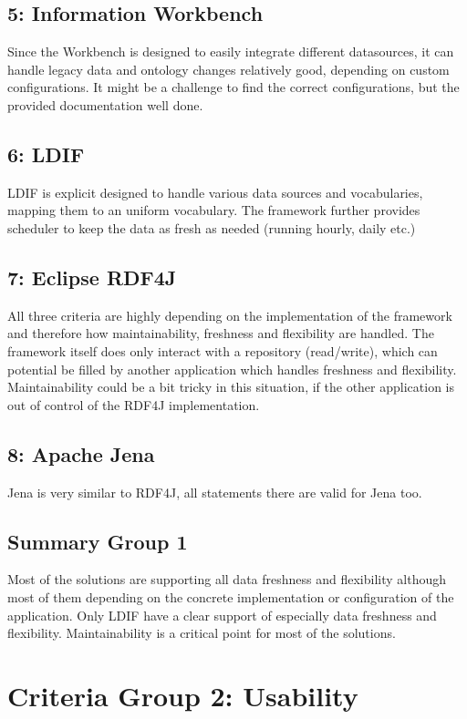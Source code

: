 \subsection*{5: Information Workbench}
Since the Workbench is designed to easily integrate different datasources, it can handle legacy data and ontology changes relatively good, depending on custom configurations. It might be a challenge to find the correct configurations, but the provided documentation well done.

\subsection*{6: LDIF}
LDIF is explicit designed to handle various data sources and vocabularies, mapping them to an uniform vocabulary. The framework further provides scheduler to keep the data as fresh as needed (running hourly, daily etc.)

\subsection*{7: Eclipse RDF4J}
All three criteria are highly depending on the implementation of the framework and therefore how maintainability, freshness and flexibility are handled. The framework itself does only interact with a repository (read/write), which can potential be filled by another application which handles freshness and flexibility. Maintainability could be a bit tricky in this situation, if the other application is out of control of the RDF4J implementation.

\subsection*{8: Apache Jena}
Jena is very similar to RDF4J, all statements there are valid for Jena too.

\subsection{Summary Group 1}
Most of the solutions are supporting all data freshness and flexibility although most of them depending on the concrete implementation or configuration of the application. Only LDIF have a clear support of especially data freshness and flexibility. Maintainability is a critical point for most of the solutions.

\section{Criteria Group 2: Usability}


